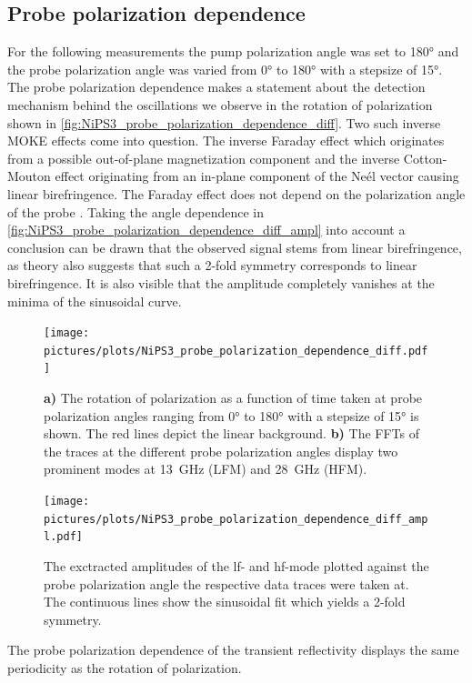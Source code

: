 \subsection{Probe polarization dependence}
For the following measurements the pump polarization angle was set to 180° and the probe polarization angle was varied from 0° to 180° with a stepsize of 15°.
The probe polarization dependence makes a statement about the detection mechanism behind the oscillations we observe in the rotation of polarization shown in \autoref{fig:NiPS3_probe_polarization_dependence_diff}.
Two such inverse MOKE effects come into question.
The inverse Faraday effect which originates from a possible out-of-plane magnetization component and the inverse Cotton-Mouton effect originating from an in-plane component of the Neél vector causing linear birefringence.
The Faraday effect does not depend on the polarization angle of the probe .
Taking the angle dependence in \autoref{fig:NiPS3_probe_polarization_dependence_diff_ampl} into account a conclusion can be drawn that the observed signal stems from linear birefringence, as theory also suggests that such a 2-fold symmetry corresponds to linear birefringence.
It is also visible that the amplitude completely vanishes at the minima of the sinusoidal curve.
\begin{figure}[hbt!]
    \centering
    \texttt{[image: pictures/plots/NiPS3\_probe\_polarization\_dependence\_diff.pdf]} \vspace{-0.3cm}
    \caption{\textbf{a)} The rotation of polarization as a function of time taken at probe polarization angles ranging from 0° to 180° with a stepsize of 15° is shown. The red lines depict the linear background. \textbf{b)} The FFTs of the traces at the different probe polarization angles display two prominent modes at \qty{13}{GHz} (LFM) and \qty{28}{GHz} (HFM).}
    \label{fig:NiPS3_probe_polarization_dependence_diff}
\end{figure}
\begin{figure}[hbt!]
    \centering  
    \texttt{[image: pictures/plots/NiPS3\_probe\_polarization\_dependence\_diff\_ampl.pdf]} \vspace{-0.3cm}
    \caption{The exctracted amplitudes of the lf- and hf-mode plotted against the probe polarization angle the respective data traces were taken at. The continuous lines show the sinusoidal fit which yields a 2-fold symmetry.}
    \label{fig:NiPS3_probe_polarization_dependence_diff_ampl}
\end{figure}
\FloatBarrier
\newpage
The probe polarization dependence of the transient reflectivity displays the same periodicity as the rotation of polarization.

